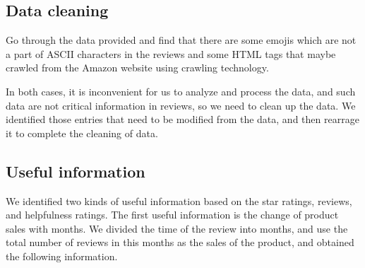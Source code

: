 \documentclass[12pt]{mcmthesis}
\begin{document}
\subsection{Data cleaning}
Go through the data provided and find that there are some emojis which are not a part of ASCII characters in the reviews and some HTML tags that maybe crawled from the Amazon website using crawling technology.

In both cases, it is inconvenient for us to analyze and process the data, and such data are not critical information in reviews, so we need to clean up the data. We identified those entries that need to be modified from the data, and then rearrage it to complete the cleaning of data.

\subsection{Useful information}
We identified two kinds of useful information based on the star ratings, reviews, and helpfulness ratings. The first useful information is the change of product sales with months. We divided the time of the review into months, and use the total number of reviews in this months as the sales of the product, and obtained the following information.
\end{document}
